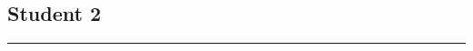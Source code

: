 \documentclass{article}
\begin{document}
\subsection{Student 2}
\begin{center}
    \color{green}\rule{1\linewidth}{0.7mm}
\end{center}

\end{document}
